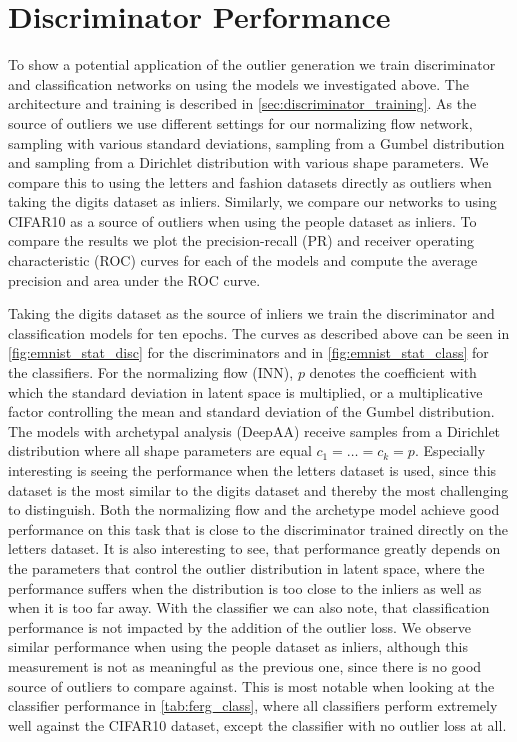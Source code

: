 \section{Discriminator Performance}%
\label{sec:discriminator_performance}

To show a potential application of the outlier generation we train
discriminator and classification networks on using the models we investigated
above. The architecture and training is described in
\autoref{sec:discriminator_training}. As the source of outliers we use
different settings for our normalizing flow network, sampling with various
standard deviations, sampling from a Gumbel distribution and sampling from a
Dirichlet distribution with various shape parameters. We compare this to using
the letters and fashion datasets directly as outliers when taking the digits
dataset as inliers. Similarly, we compare our networks to using CIFAR10 as a
source of outliers when using the people dataset as inliers. To compare the
results we plot the precision-recall (PR) and receiver operating characteristic
(ROC) curves for each of the models and compute the average precision and area
under the ROC curve.

Taking the digits dataset as the source of inliers we train the discriminator
and classification models for ten epochs. The curves as described above can be
seen in \autoref{fig:emnist_stat_disc} for the discriminators and in
\autoref{fig:emnist_stat_class} for the classifiers. For the normalizing flow
(INN), $p$ denotes the coefficient with which the standard deviation in latent
space is multiplied, or a multiplicative factor controlling the mean and
standard deviation of the Gumbel distribution. The models with archetypal
analysis (DeepAA) receive samples from a Dirichlet distribution where all shape
parameters are equal $c_1 = \dots = c_k = p$. Especially interesting is seeing
the performance when the letters dataset is used, since this dataset is the
most similar to the digits dataset and thereby the most challenging to
distinguish. Both the normalizing flow and the archetype model achieve good
performance on this task that is close to the discriminator trained directly on
the letters dataset. It is also interesting to see, that performance greatly
depends on the parameters that control the outlier distribution in latent
space, where the performance suffers when the distribution is too close to the
inliers as well as when it is too far away. With the classifier we can also
note, that classification performance is not impacted by the addition of the
outlier loss. We observe similar performance when using the people dataset as
inliers, although this measurement is not as meaningful as the previous one,
since there is no good source of outliers to compare against. This is most
notable when looking at the classifier performance in \autoref{tab:ferg_class},
where all classifiers perform extremely well against the CIFAR10 dataset,
except the classifier with no outlier loss at all.

